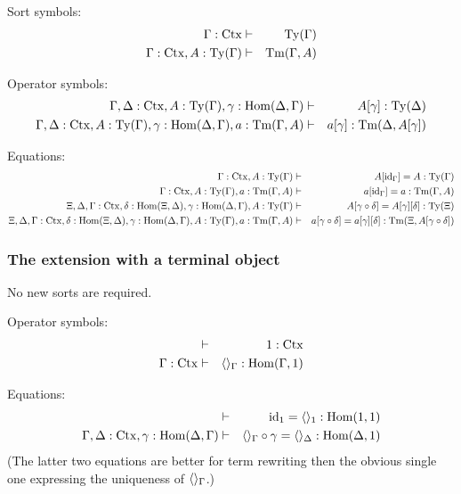 \documentclass{lmcs}
\def\Ctx{\mathrm{Ctx}}
\def\Hom{\mathrm{Hom}}
\def\id{\mathrm{id}}
\begin{document}
Sort symbols:
\begin{eqnarray*}
\Gamma : \Ctx &\vdash& \Ty(\Gamma)\\
\Gamma : \Ctx, A:\Ty(\Gamma) &\vdash& \Tm(\Gamma,A)
\end{eqnarray*}

Operator symbols:
\begin{eqnarray*}
\Gamma,\Delta : \Ctx, A:\Ty(\Gamma), \gamma : \Hom(\Delta,\Gamma) &\vdash& 
A[\gamma] : \Ty(\Delta)\\
\Gamma,\Delta : \Ctx, A:\Ty(\Gamma), \gamma : \Hom(\Delta,\Gamma), a:\Tm(\Gamma,A) &\vdash&  a[\gamma] : \Tm(\Delta,A[\gamma])
\end{eqnarray*}

Equations:
\begin{eqnarray*}
\Gamma : \Ctx, A:\Ty(\Gamma) &\vdash& A[\id_\Gamma] = A : \Ty(\Gamma)\\
\Gamma : \Ctx, A:\Ty(\Gamma), a:\Tm(\Gamma,A) &\vdash& a[\id_\Gamma] = a : \Tm(\Gamma,A)\\
\Xi,\Delta,\Gamma : \Ctx, \delta : \Hom(\Xi,\Delta), \gamma : \Hom(\Delta,\Gamma),
A:\Ty(\Gamma) &\vdash& A[\gamma\circ\delta] = A[\gamma][\delta]: \Ty(\Xi)\\
\Xi,\Delta,\Gamma : \Ctx, \delta : \Hom(\Xi,\Delta), \gamma : \Hom(\Delta,\Gamma),
A:\Ty(\Gamma), a:\Tm(\Gamma,A) &\vdash& 
a[\gamma\circ\delta] = a[\gamma][\delta]: \Tm(\Xi,A[\gamma\circ\delta])
\end{eqnarray*}

\subsubsection{The extension with a terminal object}
No new sorts are required.
  
Operator symbols:
\begin{eqnarray*}
&\vdash& 1 : \Ctx\\
\Gamma : \Ctx &\vdash& \tuple{}_\Gamma : \Hom(\Gamma,1)
\end{eqnarray*}

Equations:
\begin{eqnarray*}
 &\vdash& \id_1 = \tuple{}_1 : \Hom(1,1)\\
\Gamma,\Delta : \Ctx, \gamma : \Hom(\Delta,\Gamma) &\vdash& 
\tuple{}_\Gamma\circ\gamma = \tuple{}_\Delta : \Hom(\Delta,1)
\end{eqnarray*}
(The latter two equations are better for term rewriting then the
obvious single one expressing the uniqueness of $\langle  \rangle_\Gamma$.)
\end{document}
